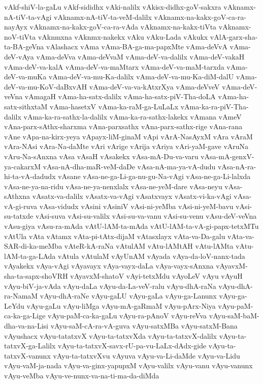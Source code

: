 {vAkf-shiV-la-gaLu
vAkf-sididhx
vAki-nalilx
vAkisx-didhx-goV-sakxra
vAknamx-nA-tiV-ta-vAgi
vAknamx-nA-tiV-ta-veM-dalilx
vAknamx-na-kakx-goV-ca-ra-nayAyx
vAknamx-na-kakx-goV-ca-ra-vAda
vAknamx-na-kakx-tiVta
vAknamx-noV-tiVta
vAknmxna
vAknmx-nakekx
vAku
vAku-Lada
vAkukx
vAlA-garx-sha-ta-BA-geVna
vAlashacx
vAma
vAma-BA-ga-ma-papxMte
vAma-deVvA
vAma-deV-vAya
vAma-deVva
vAma-deVvaM
vAma-deV-va-dalilx
vAma-deV-vakaH
vAma-deV-va-kalA
vAma-deV-va-maMtarx
vAma-deV-va-maM-tarxda
vAma-deV-va-muKa
vAma-deV-va-mu-Ka-dalilx
vAma-deV-va-mu-Ka-diM-dalU
vAma-deV-va-mu-KoV-daBxvAH
vAma-deV-va-va-kAtxrXya
vAma-deVveV
vAma-deV-veVna
vAmagaH
vAma-ha-satx-dalilx
vAma-ha-satx-piV-Tha-doLA
vAma-ha-satx-sithxtaM
vAma-hasetxV
vAma-ka-raM-ga-LuLaLx
vAma-ka-ra-piV-Tha-dalilx
vAma-ka-ra-sathx-la-dalilx
vAma-ka-ra-sathx-lakekx
vAmana
vAmeV
vAna-parx-sAthx-sharxma
vAna-parxsathx
vAna-parx-sathx-rige
vAna-rana
vAne
vApa-na-kirx-yeya
vApayx-liM-ginaM
vApi
vArA-NasAyxM
vAra
vAraM
vAra-NAsi
vAra-Na-daMte
vAri
vArige
vArija
vAriya
vAri-yaM-gave
vAruNa
vAru-Na-sAnxna
vAsa
vAsaH
vAsakekx
vAsa-mA-Du-va-varu
vAsa-mA-genxV-ya-cakarxM
vAsa-nA-dha-maR-veM-daDe
vAsa-nA-ma-ya-vA-dudu
vAsa-nA-ra-hi-ta-vA-dadudx
vAsane
vAsa-ne-ga-Li-ga-nu-gu-Na-vAgi
vAsa-ne-ga-Li-lalxda
vAsa-ne-ya-na-ridu
vAsa-ne-ya-nenxlalx
vAsa-ne-yeM-dare
vAsa-neyu
vAsa-sAthxna
vAsatx-va-dalilx
vAsatx-va-vAgi
vAsatxvayx
vAsatx-vi-ka-vAgi
vAsa-vA-gi-ruva
vAsa-vidudx
vAsini
vAsiniV
vAsi-ni-yeMba
vAsi-ni-yeM-bavu
vAsi-su-tatxde
vAsi-suva
vAsi-su-valilx
vAsi-su-va-vanu
vAsi-su-venu
vAsu-deV-veVna
vAsu-giya
vAsu-ra-mAda
vAtU-lAM-ta-mAda
vAtU-lAM-ta-vA-gi-papx-tetxMTu
vAtUla
vAta
vAtamx
vAta-pi-tAtx-dijaM
vAtasxlayx
vAta-va-Da-galu
vAta-va-SAR-di-ka-meMba
vAteR-kA-raNa
vAtulAM
vAtu-lAMtAH
vAtu-lAMta
vAtu-lAM-ta-ga-LAda
vAtula
vAtulaM
vAyUnAM
vAyada
vAya-da-loV-nanx-tada
vAyakekx
vAya-vAgi
vAyavayx
vAya-vayx-daLa
vAya-vayx-sAnxna
vAyavxM-sha-ta-sapx-shoVRH
vAyavxM-shatoV
vAyi-tetxMdu
vAyoLeV
vAyu
vAyuH
vAyu-biV-ja-vAda
vAyu-daLa
vAyu-da-La-veV-ralu
vAyu-dhA-raNa
vAyu-dhA-ra-NamaM
vAyu-dhA-raNe
vAyu-gaLU
vAyu-gaLa
vAyu-ga-Lanunx
vAyu-ga-LeYdu
vAyu-gaLu
vAyu-liMga
vAyu-mA-gaRmaM
vAyu-pArx-Niya
vAyu-paM-ca-ka-ga-Lige
vAyu-paM-ca-ka-gaLu
vAyu-ra-pAnoV
vAyu-reVva
vAyu-saM-baM-dha-va-na-Lisi
vAyu-saM-cA-ra-vA-guva
vAyu-satxMBa
vAyu-satxM-Bana
vAyushacx
vAyu-tatatxvX
vAyu-ta-tatxvXda
vAyu-ta-tatxvX-dalilx
vAyu-ta-tatxvX-ga-Lalilx
vAyu-ta-tatxvX-savx-rU-pa-vu-LaLx-dAdx-gide
vAyu-ta-tatxvX-vanunx
vAyu-ta-tatxvXvu
vAyuva
vAyu-va-Li-daMde
vAyu-va-Lidu
vAyu-vaM-ja-nada
vAyu-va-ginx-yapupxM
vAyu-valilx
vAyu-vanu
vAyu-vanunx
vAyu-veMba
vAyu-ve-nunx-va-na-ti-ma-da-diMda
}
